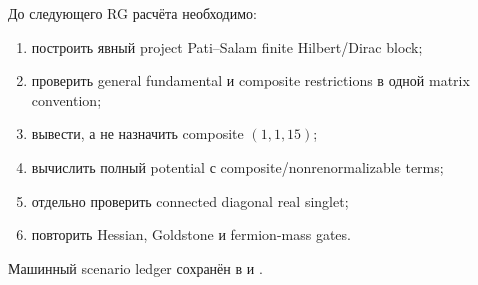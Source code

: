\begin{protocol}
До следующего RG расчёта необходимо:
\begin{enumerate}
 \item построить явный project Pati--Salam finite Hilbert/Dirac block;
 \item проверить general fundamental и composite restrictions в одной
 matrix convention;
 \item вывести, а не назначить composite \((1,1,15)\);
 \item вычислить полный potential с composite/nonrenormalizable terms;
 \item отдельно проверить connected diagonal real singlet;
 \item повторить Hessian, Goldstone и fermion-mass gates.
\end{enumerate}
\end{protocol}

Машинный scenario ledger сохранён в
 и
.